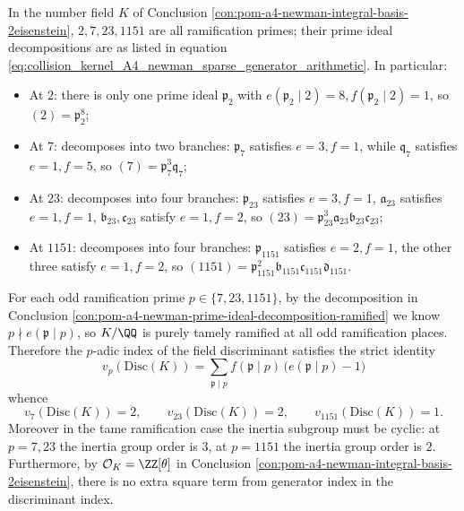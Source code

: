 \begin{conclusion}\label{con:pom-a4-newman-prime-ideal-decomposition-ramified}
In the number field \(K\) of Conclusion \ref{con:pom-a4-newman-integral-basis-2eisenstein},
\(2,7,23,1151\) are all ramification primes; their prime ideal decompositions are as listed in equation \eqref{eq:collision_kernel_A4_newman_sparse_generator_arithmetic}.
In particular:
\begin{itemize}
  \item At \(2\): there is only one prime ideal \(\mathfrak p_2\) with \(e(\mathfrak p_2\mid 2)=8,f(\mathfrak p_2\mid 2)=1\), so \((2)=\mathfrak p_2^{8}\);
  \item At \(7\): decomposes into two branches: \(\mathfrak p_7\) satisfies \(e=3,f=1\), while \(\mathfrak q_7\) satisfies \(e=1,f=5\), so \((7)=\mathfrak p_7^{3}\mathfrak q_7\);
  \item At \(23\): decomposes into four branches: \(\mathfrak p_{23}\) satisfies \(e=3,f=1\), \(\mathfrak a_{23}\) satisfies \(e=1,f=1\), \(\mathfrak b_{23},\mathfrak c_{23}\) satisfy \(e=1,f=2\), so \((23)=\mathfrak p_{23}^{3}\mathfrak a_{23}\mathfrak b_{23}\mathfrak c_{23}\);
  \item At \(1151\): decomposes into four branches: \(\mathfrak p_{1151}\) satisfies \(e=2,f=1\), the other three satisfy \(e=1,f=2\), so \((1151)=\mathfrak p_{1151}^{2}\mathfrak b_{1151}\mathfrak c_{1151}\mathfrak d_{1151}\).
\end{itemize}
\end{conclusion}

\begin{conclusion}\label{con:pom-a4-newman-tame-discriminant-inertia}
For each odd ramification prime \(p\in\{7,23,1151\}\), by the decomposition in Conclusion \ref{con:pom-a4-newman-prime-ideal-decomposition-ramified} we know \(p\nmid e(\mathfrak p\mid p)\), so \(K/\QQ\) is purely tamely ramified at all odd ramification places.
Therefore the \(p\)-adic index of the field discriminant satisfies the strict identity
\[
\boxed{\;
v_p(\mathrm{Disc}(K))=\sum_{\mathfrak p\mid p} f(\mathfrak p\mid p)\,\bigl(e(\mathfrak p\mid p)-1\bigr)\;}
\]
whence
\[
v_7(\mathrm{Disc}(K))=2,\qquad v_{23}(\mathrm{Disc}(K))=2,\qquad v_{1151}(\mathrm{Disc}(K))=1.
\]
Moreover in the tame ramification case the inertia subgroup must be cyclic: at \(p=7,23\) the inertia group order is \(3\), at \(p=1151\) the inertia group order is \(2\).
Furthermore, by \(\mathcal O_K=\ZZ[\theta]\) in Conclusion \ref{con:pom-a4-newman-integral-basis-2eisenstein}, there is no extra square term from generator index in the discriminant index.
\end{conclusion}

